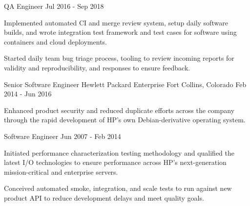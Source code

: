 \begin{cventries}
  \cventry
    {QA Engineer}
    {}
    {}
    {Jul 2016 - Sep 2018}
    {
      \begin{cvitems}
        \item {
          Implemented automated CI and merge review system, setup daily
          software builds, and wrote integration test framework and test
          cases for software using containers and cloud deployments.
        }
        \item {
          Started daily team bug triage process, tooling to review
          incoming reports for validity and reproducibility, and responses
          to ensure feedback.
        }
      \end{cvitems}
    }
    {}

  \cventry
    {Senior Software Engineer}
    {Hewlett Packard Enterprise}
    {Fort Collins, Colorado}
    {Feb 2014 - Jun 2016}
    {}
    {
      \begin{cvitems}
        \item {
          Enhanced product security and reduced duplicate efforts across the
          company through the rapid development of HP's own Debian-derivative
          operating system.
        }
      \end{cvitems}
    }

  \cventry
    {Software Engineer}
    {}
    {}
    {Jun 2007 - Feb 2014}
    {}
    {
      \begin{cvitems}
        \item {
          Initiated performance characterization testing methodology and
          qualified the latest I/O technologies to ensure performance across
          HP’s next-generation mission-critical and enterprise servers.
        }
        \item {
          Conceived automated smoke, integration, and scale tests to run
          against new product API to reduce development delays and meet
          quality goals.
        }
      \end{cvitems}
    }

\end{cventries}
